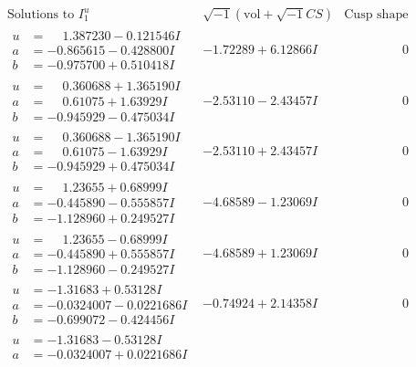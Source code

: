 \documentclass[1p]{elsarticle_modified}
\theoremstyle{definition}
\newcommand{\I}{\sqrt{-1}}
\begin{document}
$$\begin{array}{c|c|c}
\text{Solutions to }I^u_{1}& \I (\text{vol} + \sqrt{-1}CS) & \text{Cusp shape}\\
 \hline 
\begin{aligned}
u &= \phantom{-}1.387230 - 0.121546 I \\
a &= -0.865615 - 0.428800 I \\
b &= -0.975700 + 0.510418 I\end{aligned}
 & -1.72289 + 6.12866 I & \phantom{-0.000000 } 0 \\ \hline\begin{aligned}
u &= \phantom{-}0.360688 + 1.365190 I \\
a &= \phantom{-}0.61075 + 1.63929 I \\
b &= -0.945929 - 0.475034 I\end{aligned}
 & -2.53110 - 2.43457 I & \phantom{-0.000000 } 0 \\ \hline\begin{aligned}
u &= \phantom{-}0.360688 - 1.365190 I \\
a &= \phantom{-}0.61075 - 1.63929 I \\
b &= -0.945929 + 0.475034 I\end{aligned}
 & -2.53110 + 2.43457 I & \phantom{-0.000000 } 0 \\ \hline\begin{aligned}
u &= \phantom{-}1.23655 + 0.68999 I \\
a &= -0.445890 - 0.555857 I \\
b &= -1.128960 + 0.249527 I\end{aligned}
 & -4.68589 - 1.23069 I & \phantom{-0.000000 } 0 \\ \hline\begin{aligned}
u &= \phantom{-}1.23655 - 0.68999 I \\
a &= -0.445890 + 0.555857 I \\
b &= -1.128960 - 0.249527 I\end{aligned}
 & -4.68589 + 1.23069 I & \phantom{-0.000000 } 0 \\ \hline\begin{aligned}
u &= -1.31683 + 0.53128 I \\
a &= -0.0324007 - 0.0221686 I \\
b &= -0.699072 - 0.424456 I\end{aligned}
 & -0.74924 + 2.14358 I & \phantom{-0.000000 } 0 \\ \hline\begin{aligned}
u &= -1.31683 - 0.53128 I \\
a &= -0.0324007 + 0.0221686 I \\

\end{aligned}
\end{array}$$
\end{document}
